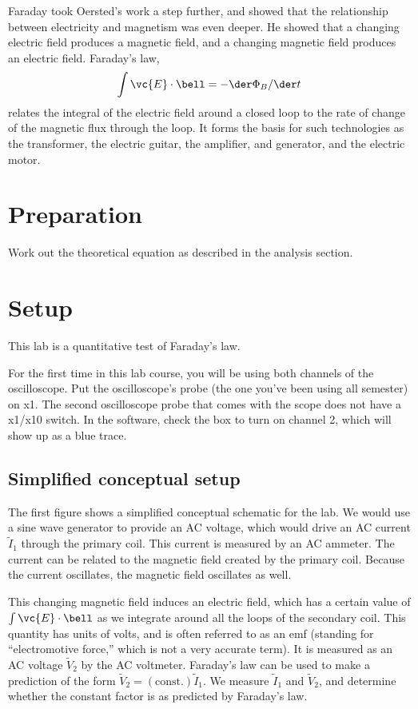 Faraday took Oersted's work a step further, and showed that
the relationship between electricity and magnetism was even
deeper. He showed that a changing electric field produces a
magnetic field, and a changing magnetic field produces an
electric field. Faraday's law,
\begin{equation*}
      \int \vc{E}\cdot\bell  =  -\der\Phi_B/\der t  
\end{equation*}
relates the integral of the electric field around a
closed loop to the rate of change of the magnetic flux
through the loop. It forms the basis for such technologies
as the transformer, the electric guitar, the amplifier, and
generator, and the electric motor.

\section*{Preparation}

Work out the theoretical equation as described in the analysis section.

\section*{Setup}

This lab is a quantitative test of Faraday's
law. 

For the first time in this lab course, you will be using both channels
of the oscilloscope.
Put the oscilloscope's probe (the one you've been using all semester)
on x1.
The second oscilloscope probe that comes with the scope does not have
a x1/x10 switch. In the software, check the box to turn on channel 2,
which will show up as a blue trace.


\subsection*{Simplified conceptual setup}

The first figure shows a simplified conceptual schematic for the lab.
We would use a sine wave generator to provide an AC voltage, which
would drive an AC current $\tilde{I}_1$  through the primary coil. This current
is measured by an AC ammeter. The current can be related to the magnetic
field created by the primary coil. Because the current oscillates,
the magnetic field oscillates as well.


This changing magnetic field induces an electric field, which has
a certain value of $\int \vc{E}\cdot\bell$ as we integrate around
all the loops of the secondary coil. This quantity has units of
volts, and is often referred to as an emf (standing for ``electromotive
force,'' which is not a very accurate term). It is measured as an AC
voltage $\tilde{V}_2$ by the AC voltmeter. Faraday's law can be
used to make a prediction of the form $\tilde{V}_2=(\text{const.})\tilde{I}_1$.
We measure $\tilde{I}_1$ and $\tilde{V}_2$, and determine whether the constant
factor is as predicted by Faraday's law.

